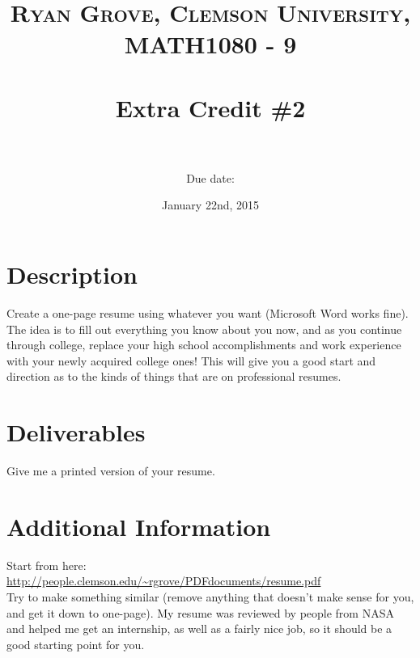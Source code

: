 \documentclass[paper=a4, fontsize=11pt]{scrartcl} %
\title{	
\normalfont \normalsize 
\textsc{Ryan Grove, Clemson University, MATH1080 - 9} \\ [25pt] %
\horrule{0.5pt} \\[0.4cm] %
\huge Extra Credit \#2 \\ %
\horrule{2pt} \\[0.5cm] %
}
\author{Due date:} %
\date{\normalsize January 22nd, 2015} %
\numberwithin{equation}{section} %
\numberwithin{figure}{section} %
\numberwithin{table}{section} %
\begin{document}
\maketitle %


\section*{\textbf{Description}}

Create a one-page resume using whatever you want (Microsoft Word works fine). The idea is to fill out everything you know about you now, and as you continue through college, replace your high school accomplishments and
work experience with your newly acquired college ones! This will give you a good start and direction as to the kinds of things that are on professional resumes.


\section*{\textbf{Deliverables}}

Give me a printed version of your resume.


\section*{\textbf{Additional Information}}

Start from here:\\
\url{http://people.clemson.edu/~rgrove/PDFdocuments/resume.pdf}\\

Try to make something similar (remove anything that doesn't make sense for you, and get it down to one-page). My resume was reviewed by people from NASA and helped me get an internship, as well as a fairly nice job, so it should be a good starting point for you.

\end{document}
